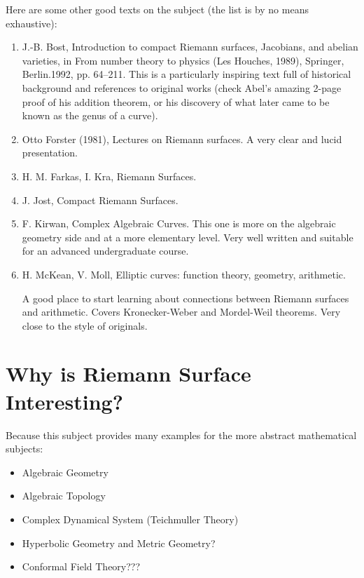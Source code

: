 \documentclass[a4paper,11pt]{article}
\begin{document}
\begin{itemize}
  Here are some other good texts on the subject (the list is by no
  means exhaustive):
  \begin{enumerate}
  \item J.-B. Bost, Introduction to compact Riemann surfaces,
    Jacobians, and abelian varieties, in From number theory to physics
    (Les Houches, 1989), Springer, Berlin.1992, pp. 64--211. This is a
    particularly inspiring text full of historical background and
    references to original works (check Abel's amazing 2-page proof of
    his addition theorem, or his discovery of what later came to be
    known as the genus of a curve). 

  \item Otto Forster (1981), Lectures on Riemann surfaces. A very
    clear and lucid presentation.
  \item H. M. Farkas, I. Kra, Riemann Surfaces.
  \item J. Jost, Compact Riemann Surfaces.
  \item F. Kirwan, Complex Algebraic Curves.
    This one is more on the algebraic geometry side and at a more
    elementary level. Very well written and suitable for an advanced
    undergraduate course.
  \item H. McKean, V. Moll, Elliptic curves: function theory,
    geometry, arithmetic.

    A good place to start learning about connections between Riemann
    surfaces and arithmetic. Covers Kronecker-Weber and Mordel-Weil
    theorems. Very close to the style of originals. 
  \end{enumerate}
\end{itemize}





\section{Why is Riemann Surface Interesting?}

Because this subject provides many examples for the more abstract
mathematical subjects:
\begin{itemize}
\item Algebraic Geometry
\item Algebraic Topology
\item Complex Dynamical System (Teichmuller Theory)
\item Hyperbolic Geometry and Metric Geometry?
\item Conformal Field Theory???
\end{itemize}
\end{document}
